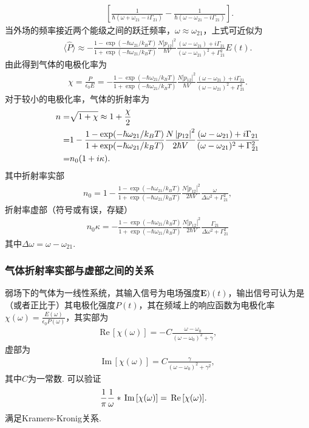 \documentclass[a4paper, 10pt]{article}
\providecommand{\abs}[1]{\left\lvert#1\right\rvert} %
\providecommand{\re}{\,\text{Re}\,} %
\providecommand{\im}{\,\text{Im}\,} %
\begin{document}
\begin{multicols*}{2}
\begin{align}
    &\qquad\left[\frac{1}{\hbar(\omega+\omega_{21}-i\Gamma_{21})}-\frac{1}{\hbar(\omega-\omega_{21}-i\Gamma_{21})}\right].
\end{align}
当外场的频率接近两个能级之间的跃迁频率，$\omega\approx\omega_{21}$，上式可近似为
\scriptsize
\begin{align}
    \langle\hat{P}\rangle\approx-\frac{1-\exp(-\hbar\omega_{21}/k_BT)}{1+\exp(-\hbar\omega_{21}/k_BT)}\frac{N\abs{p_{12}}^2}{\hbar V}\frac{(\omega-\omega_{21})+i\Gamma_{21}}{(\omega-\omega_{21})^2+\Gamma_{21}^2}E(t).
\end{align}
\normalsize
由此得到气体的电极化率为
\small
\begin{align}
    \chi=\frac{P}{\epsilon_0E}=-\frac{1-\exp(-\hbar\omega_{21}/k_BT)}{1+\exp(-\hbar\omega_{21}/k_BT)}\frac{N\abs{p_{12}}^2}{\hbar V}\frac{(\omega-\omega_{21})+i\Gamma_{21}}{(\omega-\omega_{21})^2+\Gamma_{21}^2}.
\end{align}
\normalsize
对于较小的电极化率，气体的折射率为
\begin{align}
    \notag n=&\sqrt{1+\chi}\approx 1+\frac{\chi}{2}\\
    \notag=&1-\frac{1-\exp(-\hbar\omega_{21}/k_BT)}{1+\exp(-\hbar\omega_{21}/k_BT)}\frac{N\abs{p_{12}}^2}{2\hbar V}\frac{(\omega-\omega_{21})+i\Gamma_{21}}{(\omega-\omega_{21})^2+\Gamma_{21}^2}\\
    =&n_0(1+i\kappa).
\end{align}
其中折射率实部
\begin{align}
    n_0=1-\frac{1-\exp(-\hbar\omega_{21}/k_BT)}{1+\exp(-\hbar\omega_{21}/k_BT)}\frac{N\abs{p_{12}}^2}{2\hbar V}\frac{\omega}{\Delta\omega^2+\Gamma_{21}^2},
\end{align}
折射率虚部（符号或有误，存疑）
\begin{align}
    n_0\kappa=-\frac{1-\exp(-\hbar\omega_{21}/k_BT)}{1+\exp(-\hbar\omega_{21}/k_BT)}\frac{N\abs{p_{12}}^2}{2\hbar V}\frac{\Gamma_{21}}{\Delta\omega^2+\Gamma_{21}^2}
\end{align}
其中$\Delta\omega=\omega-\omega_{21}$.

\subsubsection{气体折射率实部与虚部之间的关系}
弱场下的气体为一线性系统，其输入信号为电场强度$\bm{E})(t)$，输出信号可认为是（或者正比于）其电极化强度$P(t)$，其在频域上的响应函数为电极化率$\chi(\omega)=\frac{E(\omega)}{\epsilon_0P(\omega)}$，其实部为
\begin{align}
    \re[\chi(\omega)]=-C\frac{\omega-\omega_0}{(\omega-\omega_0)^2+\gamma},
\end{align}
虚部为
\begin{align}
    \im[\chi(\omega)]=C\frac{\gamma}{(\omega-\omega_0)^2+\gamma^2},
\end{align}
其中$C$为一常数.
可以验证
\begin{align}
    \notag&\frac{1}{\pi}\frac{1}{\omega}*\im[\chi(\omega)]=\re[\chi(\omega)].
\end{align}
满足Kramers-Kronig关系.


\end{multicols*}
\end{document}
